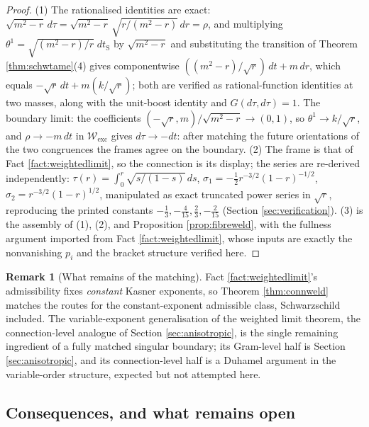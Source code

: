 \documentclass[11pt]{article}
\theoremstyle{definition}
\newtheorem{remark}[theorem]{Remark}
\newcommand{\shW}{\mathcal{W}}
\newcommand{\dtS}{dt_{\mathrm{S}}}
\newcommand{\dtPG}{dt}
\begin{document}
\begin{proof}
(1) The rationalised identities are exact: $\sqrt{m^2-r}\,d\tau = \sqrt{m^2-r}\,\sqrt{r/(m^2-r)}\,dr = \rho$, and multiplying $\theta^1 = \sqrt{(m^2-r)/r}\;\dtS$ by $\sqrt{m^2-r}$ and substituting the transition of Theorem \ref{thm:schwtame}(4) gives componentwise $((m^2-r)/\sqrt r)\,\dtPG + m\,dr$, which equals $-\sqrt r\,\dtPG + m(k/\sqrt r)$; both are verified as rational-function identities at two masses, along with the unit-boost identity and $G(d\tau,d\tau) = 1$. The boundary limit: the coefficients $(-\sqrt r, m)/\sqrt{m^2-r} \to (0,1)$, so $\theta^1 \to k/\sqrt r$, and $\rho \to -m\,\dtPG$ in $\shW_{\mathrm{exc}}$ gives $d\tau \to -\dtPG$: after matching the future orientations of the two congruences the frames agree on the boundary. (2) The frame is that of Fact \ref{fact:weightedlimit}, so the connection is its display; the series are re-derived independently: $\tau(r) = \int_0^r \sqrt{s/(1-s)}\,ds$, $\sigma_1 = -\tfrac12 r^{-3/2}(1-r)^{-1/2}$, $\sigma_2 = r^{-3/2}(1-r)^{1/2}$, manipulated as exact truncated power series in $\sqrt r$, reproducing the printed constants $-\tfrac13, -\tfrac{4}{15}, \tfrac23, -\tfrac{2}{15}$ (Section \ref{sec:verification}). (3) is the assembly of (1), (2), and Proposition \ref{prop:fibreweld}, with the fullness argument imported from Fact \ref{fact:weightedlimit}, whose inputs are exactly the nonvanishing $p_i$ and the bracket structure verified here.
\end{proof}

\begin{remark}[What remains of the matching]\label{rem:weldopen}
Fact \ref{fact:weightedlimit}'s admissibility fixes \emph{constant} Kasner exponents, so Theorem \ref{thm:connweld} matches the routes for the constant-exponent admissible class, Schwarzschild included. The variable-exponent generalisation of the weighted limit theorem, the connection-level analogue of Section \ref{sec:anisotropic}, is the single remaining ingredient of a fully matched singular boundary; its Gram-level half is Section \ref{sec:anisotropic}, and its connection-level half is a Duhamel argument in the variable-order structure, expected but not attempted here.
\end{remark}

\subsection{Consequences, and what remains open}\label{subsec:schwscope}
\end{document}
